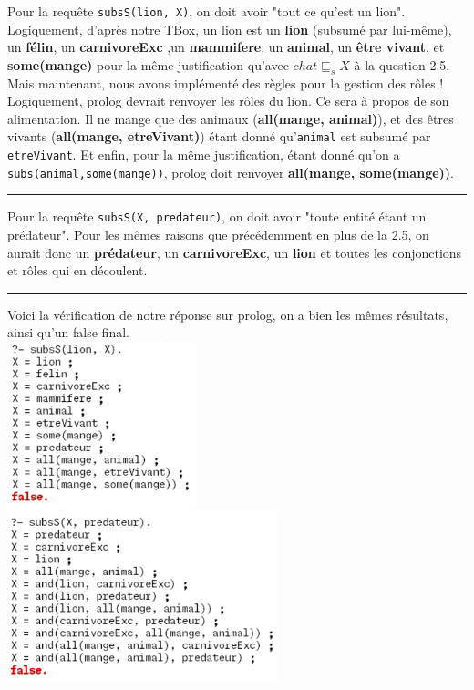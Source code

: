 \documentclass[a4paper,12pt]{report}
\begin{document}
\begin{tcolorbox}[colback=gray!10, colframe=blue!30, coltitle=black, title=Réponse à la question 4.5 - 1/1]

    Pour la requête \texttt{subsS(lion, X)}, on doit avoir "tout ce qu'est un lion". Logiquement, d'après notre TBox, un lion est un \textbf{lion} (subsumé par lui-même),
        un \textbf{félin}, un \textbf{carnivoreExc} ,un \textbf{mammifere}, un \textbf{animal}, un \textbf{être vivant}, et \textbf{some(mange)} pour la même justification qu'avec 
        \(chat \sqsubseteq_s X\) à la question 2.5.\\
    
    Mais maintenant, nous avons implémenté des règles pour la gestion des rôles ! Logiquement, prolog devrait renvoyer les rôles du lion. Ce sera à propos de son alimentation.
        Il ne mange que des animaux (\textbf{all(mange, animal)}), et des êtres vivants (\textbf{all(mange, etreVivant)}) étant donné qu'\texttt{animal} est subsumé par 
        \texttt{etreVivant}. Et enfin, pour la même justification, étant donné qu'on a \texttt{subs(animal,some(mange))}, prolog doit renvoyer \textbf{all(mange, some(mange))}.

    
    \vspace{0.5cm}
    \hrule
    \vspace{0.5cm}


    Pour la requête \texttt{subsS(X, predateur)}, on doit avoir "toute entité étant un prédateur". Pour les mêmes raisons que précédemment en plus de la 2.5, on aurait donc un 
        \textbf{prédateur}, un \textbf{carnivoreExc}, un \textbf{lion} et toutes les conjonctions et rôles qui en découlent.


    \vspace{0.5cm}
    \hrule
    \vspace{0.5cm}


    Voici la vérification de notre réponse sur prolog, on a bien les mêmes résultats, ainsi qu'un false final.\\[0.5cm]
    \includegraphics[width=0.41\textwidth]{./images/lion_X.png}
    \includegraphics[width=0.59\textwidth]{./images/X_predateur.png}

\end{tcolorbox}
\end{document}
